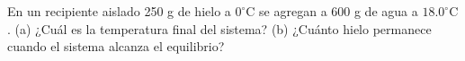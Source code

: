 \item En un recipiente aislado 250 g de hielo a $0^\circ\text{C}$ se agregan a 600 g de agua a $18.0^\circ\text{C}$. (a) ¿Cuál es la temperatura final del sistema? (b) ¿Cuánto hielo permanece cuando el sistema alcanza el equilibrio?
